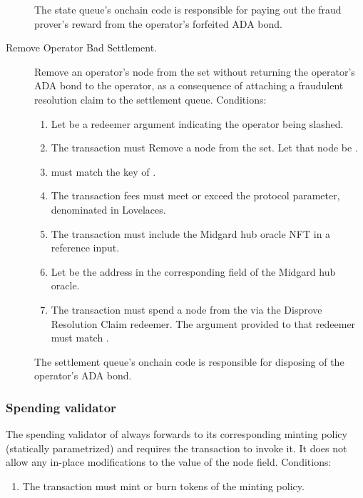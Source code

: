 \documentclass[../midgard.tex]{subfiles}
\begin{document}
\begin{description}
        The state queue's onchain code is responsible for paying out the fraud prover's reward from the operator's forfeited ADA bond.
    \item[Remove Operator Bad Settlement.] Remove an operator's node from the  set without returning the operator's ADA bond to the operator, as a consequence of attaching a fraudulent resolution claim to the settlement queue.
      Conditions:
        \begin{enumerate}
            \item Let  be a redeemer argument indicating the operator being slashed.
            \item The transaction must Remove a node from the  set.
              Let that node be .
            \item {} must match the key of .
            \item The transaction fees must meet or exceed the  protocol parameter, denominated in Lovelaces.
            \item The transaction must include the Midgard hub oracle NFT in a reference input.
            \item Let  be the address in the corresponding field of the Midgard hub oracle.
            \item The transaction must spend a node from the  via the Disprove Resolution Claim redeemer.
              The  argument provided to that redeemer must match .
        \end{enumerate}

        The settlement queue's onchain code is responsible for disposing of the operator's ADA bond.
\end{description}

\subsubsection{Spending validator}
\label{h:retired-operators-spending-validator}

The spending validator of  always forwards to its corresponding minting policy (statically parametrized) and requires the transaction to invoke it.
It does not allow any in-place modifications to the  value of the node  field.
Conditions:
\begin{enumerate}
    \item The transaction must mint or burn tokens of the  minting policy.
\end{enumerate}
\end{document}
